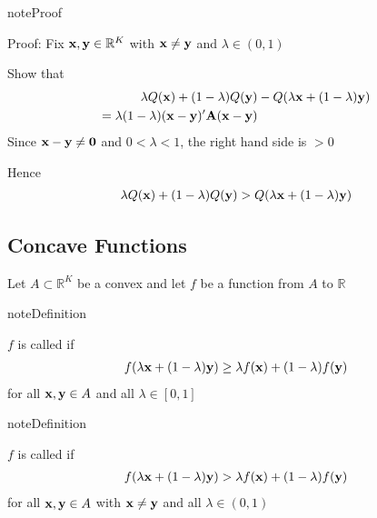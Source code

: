\documentclass[letterpaper,10pt,english]{jupyterBook}
\begin{document}
\begin{sphinxadmonition}{note}{Proof}

\sphinxAtStartPar
Proof: Fix \({\bf x}, {\bf y} \in \mathbb{R}^K\) with \({\bf x} \ne {\bf y}\) and \(\lambda \in (0, 1)\)

\sphinxAtStartPar
{} Show that
\begin{equation*}
\begin{split}
%
\lambda Q({\bf x}) + (1 - \lambda) Q({\bf y})
& - Q(\lambda {\bf x} + (1 - \lambda) {\bf y})
\\
= \lambda (1 - \lambda) ({\bf x} - {\bf y})' {\bf A} ({\bf x} - {\bf y})
%
\end{split}
\end{equation*}
\sphinxAtStartPar
Since \({\bf x} - {\bf y} \ne {\bf 0}\) and \(0 < \lambda < 1\), the right
hand side is \(> 0\)

\sphinxAtStartPar
Hence
\begin{equation*}
\begin{split}
%
\lambda Q({\bf x}) + (1 - \lambda) Q({\bf y})
> Q(\lambda {\bf x} + (1 - \lambda) {\bf y})
%
\end{split}
\end{equation*}\end{sphinxadmonition}


\subsection{Concave Functions}
\label{\detokenize{06.optimization_fundamentals:concave-functions}}
\sphinxAtStartPar
Let \(A \subset \mathbb{R}^K\) be a convex and let \(f\) be a function from \(A\) to \(\mathbb{R}\)

\begin{sphinxadmonition}{note}{Definition}

\sphinxAtStartPar
\(f\) is called  if
\begin{equation*}
\begin{split}
%
f(\lambda {\bf x} + (1 - \lambda) {\bf y})
\geq \lambda f({\bf x}) + (1 - \lambda) f({\bf y})
%
\end{split}
\end{equation*}
\sphinxAtStartPar
for all \({\bf x}, {\bf y} \in A\) and all \(\lambda \in [0, 1]\)
\end{sphinxadmonition}

\begin{sphinxadmonition}{note}{Definition}

\sphinxAtStartPar
\(f\) is called  if
\begin{equation*}
\begin{split}
%
f(\lambda {\bf x} + (1 - \lambda) {\bf y})
> \lambda f({\bf x}) + (1 - \lambda) f({\bf y})
%
\end{split}
\end{equation*}
\sphinxAtStartPar
for all \({\bf x}, {\bf y} \in A\) with \({\bf x} \ne {\bf y}\) and all \(\lambda \in (0, 1)\)
\end{sphinxadmonition}
\end{document}
